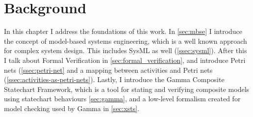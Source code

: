 \chapter{Background}\label{ch:background}

In this chapter I address the foundations of this work. In \autoref{sec:mbse} I introduce the concept of model-based systems engineering, which is a well known approach for complex system design. This includes SysML as well (\autoref{ssec:sysml}). After this I talk about Formal Verification in \autoref{sec:formal_verification}, and introduce Petri nets (\autoref{ssec:petri-net} and a mapping between activities and Petri nets (\autoref{ssec:activities-as-petri-nets}). Lastly, I introduce the Gamma Composite Statechart Framework, which is a tool for stating and verifying composite models using statechart behaviours \autoref{sec:gamma}, and a low-level formalism created for model checking used by Gamma in \autoref{sec:xsts}.


%




